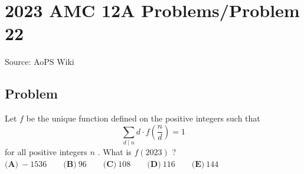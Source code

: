 \documentclass[12pt]{article}
\begin{document}
\section*{{2023 AMC 12A Problems/Problem 22}}
Source: AoPS Wiki

\subsection*{Problem}
Let $f$ be the unique function defined on the positive integers such that \[\sum_{d\mid n}d\cdot f\left(\frac{n}{d}\right)=1\] for all positive integers $n$ . What is $f(2023)$ ? $\textbf{(A)}~-1536\qquad\textbf{(B)}~96\qquad\textbf{(C)}~108\qquad\textbf{(D)}~116\qquad\textbf{(E)}~144$
\end{document}

